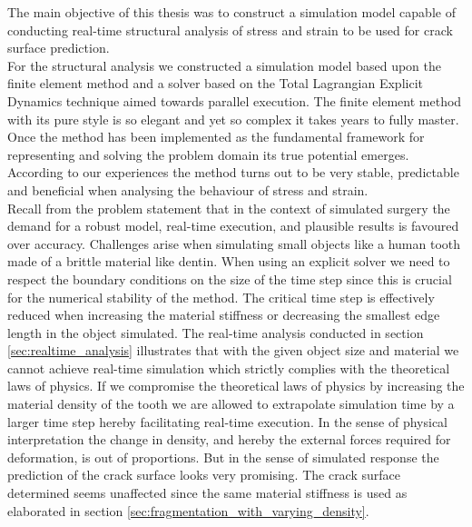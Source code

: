 
The main objective of this thesis was to construct a simulation model
capable of conducting real-time structural analysis of stress and
strain to be used for crack surface prediction. \\

%
For the structural analysis we constructed a simulation model based upon
the finite element method and a solver based on the Total Lagrangian
Explicit Dynamics technique aimed towards parallel execution. 
%
The finite element method with its pure style is so elegant and
yet so complex it takes years to fully master.
Once the method has been implemented as the fundamental framework for
representing and solving the problem domain its true potential emerges. 
According to our experiences the method turns out to be very
stable, predictable and beneficial when analysing the behaviour of stress
and strain. \\

% 
Recall from the problem statement that in the context of simulated
surgery the demand for a robust model, real-time execution, and
plausible results is favoured over accuracy.
%
Challenges arise when simulating small objects like a human tooth
made of a brittle material like dentin. 
%
When using an explicit solver we need to respect the boundary
conditions on the size of the time step since this is crucial for the
numerical stability of the method.
%
The critical time step is effectively reduced when increasing the
material stiffness or decreasing the smallest edge 
length in the object simulated.
%
The real-time analysis conducted in section
\vref{sec:realtime_analysis} illustrates that with the given
object size and material we cannot achieve real-time simulation which
strictly complies with the theoretical laws of physics.
If we compromise the
theoretical laws of physics by increasing the material density of the tooth we
are allowed to extrapolate simulation time by a larger time step hereby
facilitating real-time execution. In the sense of physical
interpretation the change in density, and hereby the external forces
required for deformation, is out of proportions. But in the sense of 
simulated response the prediction of the crack surface looks very
promising. The crack surface determined seems unaffected since the
same material stiffness is used as elaborated in 
section \vref{sec:fragmentation_with_varying_density}. \\

